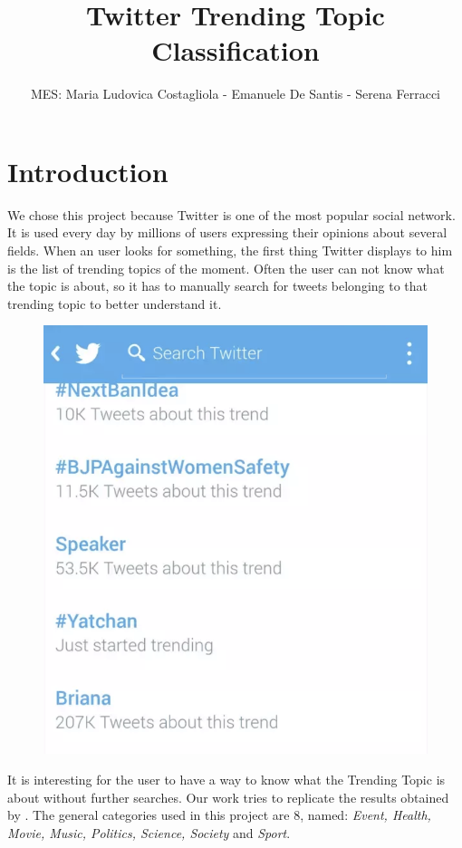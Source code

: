 \documentclass[journal,11pt]{vgtc}
\title{Twitter Trending Topic Classification}
\author{MES: Maria Ludovica Costagliola - Emanuele De Santis - Serena Ferracci}
\begin{document}
\maketitle

\section{Introduction}
We chose this project because Twitter is one of the most popular social network.
It is used every day by millions of users expressing their opinions about several fields.
When an user looks for something, the first thing Twitter displays to him is the list of
trending topics of the moment. Often the user can not know what the topic is about, so it has to manually
search for tweets belonging to that trending topic to better understand it.

\begin{figure}[h]
  \centering
  \includegraphics[scale=0.4]{screen-example}
 \end{figure}

It is interesting for the user to have a way to know what the Trending Topic is about
without further searches.
Our work tries to replicate the results obtained by \cite{lee_palsetia_narayanan_patwary_agrawal_choudhary_2011}.
The general categories used in this project are 8, named: \textit{Event, Health, Movie, Music, Politics, Science, Society} and \textit{Sport}.
\end{document}
